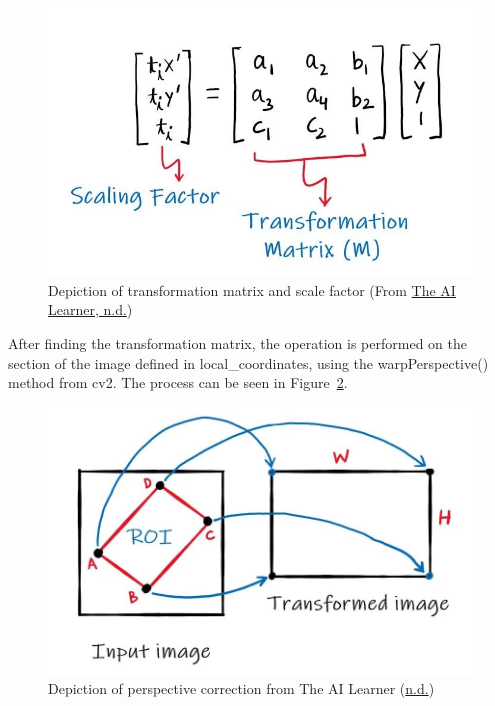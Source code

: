 \documentclass[
]{article}
\begin{document}
\begin{figure}

{\centering \includegraphics{../images/perspec-trans-matrix.jpg}

}

\caption{\label{fig-transformation-matrix}Depiction of transformation
matrix and scale factor (From
\protect\hyperlink{ref-cv2-warpperspective}{The AI Learner, n.d.})}

\end{figure}

After finding the transformation matrix, the operation is performed on
the section of the image defined in local\_coordinates, using the
warpPerspective() method from cv2. The process can be seen in
Figure~\ref{fig-perspective-transformation}.

\begin{figure}

{\centering \includegraphics{../images/perspective-transformation-visual.jpg}

}

\caption{\label{fig-perspective-transformation}Depiction of perspective
correction from The AI Learner
(\protect\hyperlink{ref-cv2-warpperspective}{n.d.})}

\end{figure}
\end{document}
